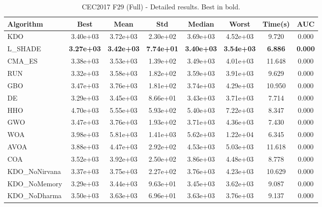 \begin{table}[H]
\centering\small
\caption{CEC2017 F29 (Full) - Detailed results. Best in bold.}
\label{tab:cec2017_F29}
\begin{tabular}{lccccccc}
\toprule
\textbf{Algorithm} & \textbf{Best} & \textbf{Mean} & \textbf{Std} & \textbf{Median} & \textbf{Worst} & \textbf{Time(s)} & \textbf{AUC} \\
\midrule
KDO & 3.40e+03 & 3.72e+03 & 2.30e+02 & 3.69e+03 & 4.52e+03 & 9.720 & 0.000 \\
L_SHADE & \textbf{3.27e+03} & \textbf{3.42e+03} & \textbf{7.74e+01} & \textbf{3.40e+03} & \textbf{3.54e+03} & \textbf{6.886} & \textbf{0.000} \\
CMA_ES & 3.38e+03 & 3.53e+03 & 1.39e+02 & 3.49e+03 & 4.01e+03 & 11.648 & 0.000 \\
RUN & 3.32e+03 & 3.58e+03 & 1.82e+02 & 3.59e+03 & 3.91e+03 & 9.629 & 0.000 \\
GBO & 3.47e+03 & 3.76e+03 & 1.81e+02 & 3.74e+03 & 4.29e+03 & 10.950 & 0.000 \\
DE & 3.29e+03 & 3.45e+03 & 8.66e+01 & 3.43e+03 & 3.71e+03 & 7.714 & 0.000 \\
HHO & 4.70e+03 & 5.55e+03 & 5.93e+02 & 5.40e+03 & 7.22e+03 & 8.347 & 0.000 \\
GWO & 3.47e+03 & 3.76e+03 & 1.93e+02 & 3.71e+03 & 4.36e+03 & 7.430 & 0.000 \\
WOA & 3.98e+03 & 5.81e+03 & 1.41e+03 & 5.62e+03 & 1.22e+04 & 6.345 & 0.000 \\
AVOA & 3.88e+03 & 4.47e+03 & 2.92e+02 & 4.53e+03 & 5.03e+03 & 11.618 & 0.000 \\
COA & 3.52e+03 & 3.92e+03 & 2.50e+02 & 3.86e+03 & 4.48e+03 & 8.778 & 0.000 \\
KDO_NoNirvana & 3.37e+03 & 3.75e+03 & 2.27e+02 & 3.76e+03 & 4.23e+03 & 10.629 & 0.000 \\
KDO_NoMemory & 3.29e+03 & 3.44e+03 & 9.63e+01 & 3.45e+03 & 3.62e+03 & 9.087 & 0.000 \\
KDO_NoDharma & 3.50e+03 & 3.63e+03 & 6.96e+01 & 3.63e+03 & 3.76e+03 & 9.137 & 0.000 \\
\bottomrule
\end{tabular}
\end{table}
